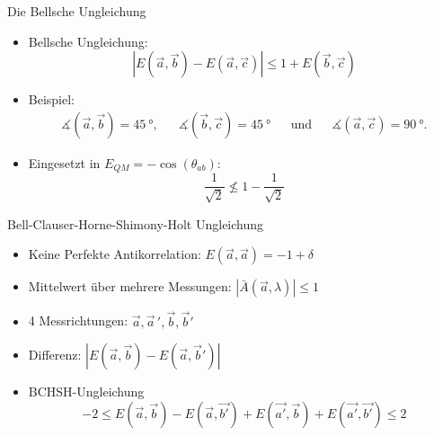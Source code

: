 \documentclass{beamer}
\begin{document}
\begin{frame}{Die Bellsche Ungleichung}
    \begin{itemize}
        \item Bellsche Ungleichung:
            \[
                \left| E(\vec{a},\vec{b}) - E(\vec{a},\vec{c}) \right| 
                \leq
                1 + E(\vec{b},\vec{c})
            \]
        \item Beispiel:
            \begin{align*}
                    \measuredangle(\vec{a},\vec{b}) = \SI{45}{\degree}, &&
                    \measuredangle(\vec{b},\vec{c}) = \SI{45}{\degree} &&
                    \text{und} &&
                    \measuredangle(\vec{a},\vec{c}) = \SI{90}{\degree}.
            \end{align*}
        \item Eingesetzt in $E_{QM} = -\cos(\theta_{ab})$:
            \[
                \frac{1}{\sqrt{2}} \nleq 1 - \frac{1}{\sqrt{2}}
            \]
    \end{itemize}
\end{frame}
\begin{frame}{Bell-Clauser-Horne-Shimony-Holt Ungleichung}
    \begin{itemize}[<+->]
        \item Keine Perfekte Antikorrelation: 
                $E(\vec{a},\vec{a}) = -1+\delta$
        \item Mittelwert \"uber mehrere Messungen: 
                $\left|\bar{A}(\vec{a},\lambda)\right| \leq 1$
        \item 4 Messrichtungen:
                $\vec{a},\vec{a}\,',\vec{b},\vec{b}'$
        \item Differenz:
                $\left| E(\vec{a},\vec{b}) - E(\vec{a},\vec{b}') \right|$
        \item BCHSH-Ungleichung
                \[
                    -2 \leq 
                    E(\vec{a},\vec{b}) - E(\vec{a},\vec{b'}) + E(\vec{a'},\vec{b}) + E(\vec{a'},\vec{b'})
                    \leq 2
                \]
    \end{itemize}
\end{frame}
\end{document}
